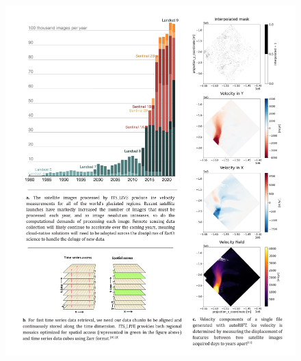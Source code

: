 \documentclass[
  super,
  preprint,
  3p,
  twocolumn]{elsarticle}
\begin{document}
\newpage{}

\begin{figure}

{\centering 

\includegraphics{figures/figure-1-consolidated.jpg}

}

\caption{\label{fig-1}\citep[See][]{Miles2023-yj, Scambos1992-jz}}

\end{figure}
\end{document}

